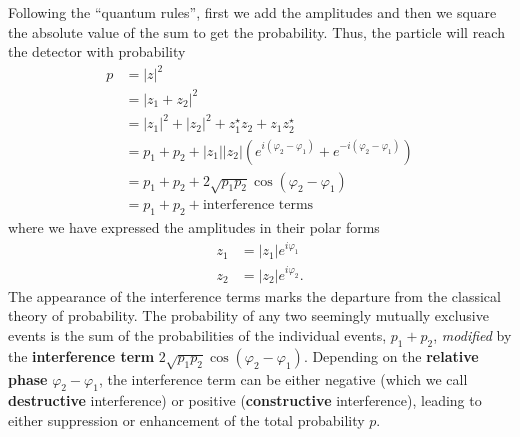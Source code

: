 \documentclass{article}
\begin{document}
Following the ``quantum rules'', first we add the amplitudes and then we square the absolute value of the sum to get the probability.
Thus, the particle will reach the detector with probability
\begin{equation}
\begin{aligned}
  p &= |z|^2
\\& = |z_1 + z_2|^2
\\& = |z_1|^2 + |z_2|^2
      + z_1^\star z_2 + z_1 z_2^\star
\\& = p_1 + p_2
      + |z_1||z_2|\left(
        e^{i(\varphi_2-\varphi_1)}
        + e^{-i(\varphi_2-\varphi_1)}
      \right)
\\& = p_1 + p_2
      + 2 \sqrt{p_1 p_2} \cos(\varphi_2-\varphi_1)
\\& = p_1 + p_2 + \mbox{interference terms}
\end{aligned}
\label{eq:interference}
\end{equation}
where we have expressed the amplitudes in their polar forms
\[
\begin{aligned}
  z_1 &= |z_1|e^{i\varphi_1}
\\z_2 &= |z_2|e^{i\varphi_2}.
\end{aligned}
\]
The appearance of the interference terms marks the departure from the classical theory of probability.
The probability of any two seemingly mutually exclusive events is the sum of the probabilities of the individual events, \(p_1 + p_2\), \emph{modified} by the \textbf{interference term} \(2 \sqrt{p_1p_2}\cos(\varphi_2-\varphi_1)\).
Depending on the \textbf{relative phase} \(\varphi_2-\varphi_1\), the interference term can be either negative (which we call \textbf{destructive} interference) or positive (\textbf{constructive} interference), leading to either suppression or enhancement of the total probability \(p\).
\end{document}
